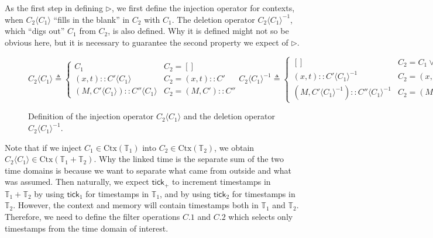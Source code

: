\documentclass[acmsmall,review]{acmart}\settopmatter{printfolios=true,printccs=false,printacmref=false}
\theoremstyle{definition}
\newcommand*{\cons}{::}
\newcommand*{\Time}{\mathbb{T}}
\newcommand*{\Ctx}{\text{Ctx}}
\newcommand*{\tick}{\mathsf{tick}}
\newcommand*{\inject}[2]{{#2}\langle{#1}\rangle}
\newcommand*{\delete}[2]{{#2}{\langle{#1}\rangle}^{-1}}
\begin{document}
As the first step in defining $\rhd$, we first define the injection operator for contexts, when $\inject{C_1}{C_2}$ ``fills in the blank'' in $C_2$ with $C_1$.
The deletion operator $\delete{C_1}{C_2}$, which ``digs out'' $C_1$ from $C_2$, is also defined.
Why it is defined might not so be obvious here, but it is necessary to guarantee the second property we expect of $\rhd$.
\begin{figure}[h!]
  \footnotesize
  \[
    \inject{C_{1}}{C_{2}}\triangleq
    \begin{cases}
      C_1                                             & C_{2}=[]              \\
      (x, t)\cons\inject{C_{1}}{C'}                   & C_{2}=(x,t)\cons C'   \\
      (M, \inject{C_{1}}{C'})\cons\inject{C_{1}}{C''} & C_{2}=(M,C')\cons C''
    \end{cases}
    \delete{C_{1}}{C_{2}}\triangleq
    \begin{cases}
      []                                              & C_{2}=C_{1}\lor C_{2}=[] \\
      (x,t)\cons\delete{C_{1}}{C'}                    & C_{2}=(x,t)\cons C'      \\
      (M, \delete{C_{1}}{C'})\cons\delete{C_{1}}{C''} & C_{2}=(M, C')\cons C''
    \end{cases}
  \]
  \caption{Definition of the injection operator $\inject{C_1}{C_2}$ and the deletion operator $\delete{C_1}{C_2}$.}
  \label{fig:concinject}
\end{figure}

Note that if we inject $C_1\in\Ctx(\Time_1)$ into $C_2\in\Ctx(\Time_2)$, we obtain $\inject{C_1}{C_2}\in\Ctx(\Time_1+\Time_2)$.
Why the linked time is the separate sum of the two time domains is because we want to separate what came from outside and what was assumed.
Then naturally, we expect $\tick_+$ to increment timestamps in $\Time_1+\Time_2$ by using $\tick_1$ for timestamps in $\Time_1$, and by using $\tick_2$ for timestamps in $\Time_2$.
However, the context and memory will contain timestamps both in $\Time_1$ and $\Time_2$.
Therefore, we need to define the filter operations $C.1$ and $C.2$ which selects only timestamps from the time domain of interest.
\end{document}
